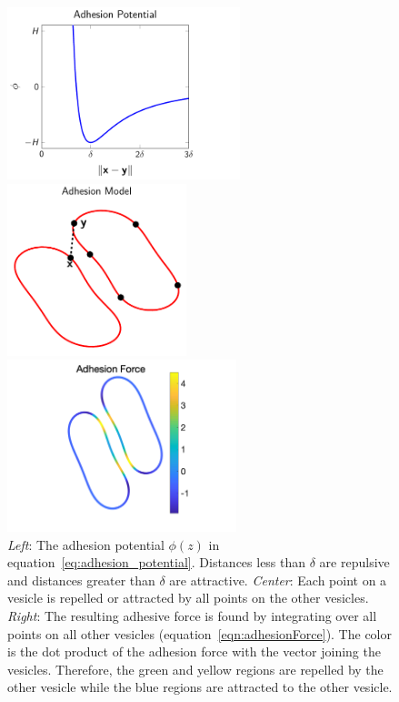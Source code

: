\documentclass[prf,superscriptaddress,showpacs]{revtex4-1}
\begin{document}
\begin{figure}[htp]
  \begin{minipage}{0.31\textwidth}
    \centering
    \includegraphics[height=5cm,trim={0cm 0cm 2cm 0cm},clip]{figs/adhesionPotential.pdf}
  \end{minipage}
  \hfill
  \begin{minipage}{0.31\textwidth}
    \centering
    \includegraphics[height=5cm]{figs/configCartoon.pdf}
  \end{minipage}
  \hfill
  \begin{minipage}{0.31\textwidth}
    \centering
    \includegraphics[height=5cm,trim={3cm 0cm 2cm 0cm},clip]{figs/Adhesion_Force.png}
  \end{minipage}
  \caption{\label{fig:adhesionModel} {\em Left}: The adhesion potential
  $\phi(z)$ in equation~\eqref{eq:adhesion_potential}.  Distances less
  than $\delta$ are repulsive and distances greater than $\delta$ are
  attractive.  {\em Center}: Each point on a vesicle is repelled or
  attracted by all points on the other vesicles.  {\em Right}: The
  resulting adhesive force is found by integrating over all points on
  all other vesicles (equation~\eqref{eqn:adhesionForce}).  The color is
  the dot product of the adhesion force with the vector joining the
  vesicles.  Therefore, the green and yellow regions are repelled by the
  other vesicle while the blue regions are attracted to the other
  vesicle.}
\end{figure}
\end{document}

